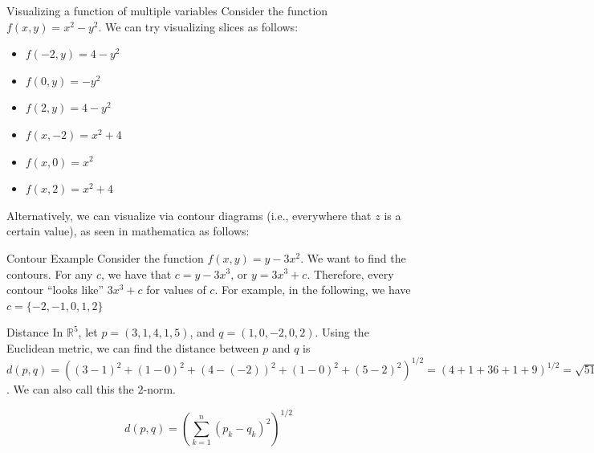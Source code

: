 \documentclass[8pt]{extarticle}
\begin{document}
  \begin{problem}{Visualizing a function of multiple variables}
    Consider the function $f(x,y) = x^2-y^2$. We can try visualizing slices as follows:
    \begin{itemize}
      \item $f(-2,y) = 4-y^2$
      \item $f(0,y) = -y^2$
      \item $f(2,y) = 4-y^2$
      \item $f(x,-2) = x^2+4$
      \item $f(x,0) = x^2$
      \item $f(x,2) = x^2+4$
    \end{itemize}
    Alternatively, we can visualize via contour diagrams (i.e., everywhere that $z$ is a certain value), as seen in mathematica as follows:
    \begin{tcbraster}[raster columns = 1,colframe = black!75!white,colback=white, title=Contour Diagram]
    \end{tcbraster}
  \end{problem}
  \begin{problem}{Contour Example}
    Consider the function $f(x,y) = y-3x^2$. We want to find the contours.
    \tcblower
    For any $c$, we have that $c = y-3x^3$, or $y = 3x^3 + c$. Therefore, every contour ``looks like'' $3x^3 + c$ for values of $c$. For example, in the following, we have $c = \{-2,-1,0,1,2\}$ 
   \begin{tcbraster}[raster columns = 1,colframe = black!75!white,colback=white]
   \end{tcbraster}
  \end{problem}
  \begin{problem}{Distance}
    In $\mathbb{R}^5$, let $p = (3,1,4,1,5)$, and $q = (1,0,-2,0,2)$. Using the Euclidean metric, we can find the distance between $p$ and $q$ is $d(p,q) = ((3-1)^2 + (1-0)^2 + (4-(-2))^2 + (1-0)^2 + (5-2)^2)^{1/2}= (4+1+36+1+9)^{1/2} = \sqrt{51} = 7.14$. We can also call this the $2$-norm.

    \[
      d(p,q) = \left(\sum_{k=1}^{n} (p_k-q_k)^2\right)^{1/2}
    \] 
  \end{problem}
\end{document}
